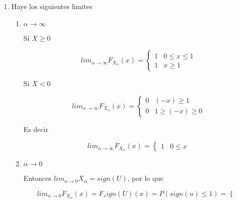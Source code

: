 \documentclass[letterpaper]{article}
\theoremstyle{definition}
\theoremstyle{lemathm}
\theoremstyle{lemademthm}
\begin{document}
\begin{enumerate}
\begin{enumerate}
\[\begin{array}{cc}
			\end{array}\right.\]
			
			y

			\[f_{X_\alpha}(x) = \frac{f_U(-(-x)^{\frac{1}{\alpha}})-(-x)^{\frac{1}{\alpha}-1}}{\alpha} = \left\{\begin{array}{cc}

				0 & (-x) \geq 1\\
				\frac{-(-x)^{\frac{1}{\alpha}-1}}{2\alpha} & 1 \geq (-x) \geq 0
			
			\end{array}\right.\]

			\item Haye los siguientes limites
			
			\begin{enumerate}
				\item $\alpha \rightarrow \infty$
				
				Si $X \geq 0$

				\[lim_{\alpha \rightarrow \infty} F_{X_\alpha}(x) = \left\{\begin{array}{cc}
		
					1 & 0 \leq x \leq 1\\
					1 & x \geq 1 
				
				\end{array}\right.\]

				Si $X < 0$

				\[lim_{\alpha \rightarrow \infty} F_{X_\alpha}(x) = \left\{\begin{array}{cc}
				
					0 & (-x) \geq 1\\
					0 & 1 \geq (-x) \geq 0
				
				\end{array}\right.\]

				Es decir

				\[lim_{\alpha \rightarrow \infty} F_{X_\alpha}(x) = \left\{\begin{array}{cc}
		
					1 & 0 \leq x
				
				\end{array}\right.\]

				\item $\alpha \rightarrow 0$
				
				Entonces $lim_{\alpha \rightarrow 0} X_{\alpha} = sign(U)$, por lo que

				\[lim_{\alpha \rightarrow 0} F_{X_\alpha}(x) = F_sign(U)(x) = P(sign(u) \leq 1)  = \left\{\begin{array}{cc}
				

\end{array}\]
\end{enumerate}
\end{enumerate}
\end{enumerate}
\end{document}
